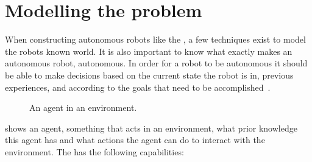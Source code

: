 \section{Modelling the problem} \label{sec:model}

When constructing autonomous robots like the \projname{}, a few techniques exist to model the robots known world. It is also important to know what exactly makes an autonomous robot, autonomous. In order for a robot to be autonomous it should be able to make decisions based on the current state the robot is in, previous experiences, and according to the goals that need to be accomplished~\citep{artificialintelligencebook}. 

\begin{figure}[H]
     \caption{\label{fig:model_mi_agent} An agent in an environment.}
\end{figure}

 shows an agent, something that acts in an environment, what prior knowledge this agent has and what actions the agent can do to interact with the environment. The \projname{} has the following capabilities:

